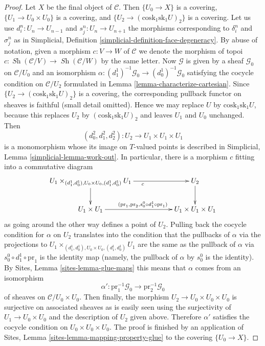 \documentclass{stacks-project}
\theoremstyle{plain}
\theoremstyle{definition}
\theoremstyle{remark}
\numberwithin{equation}{subsection}
\def\Sh{\mathop{\mathit{Sh}}\nolimits}
\begin{document}
\begin{proof}
\medskip\noindent
Let $X$ be the final object of $\mathcal{C}$.
Then $\{U_0 \to X\}$ is a covering,
$\{U_1 \to U_0 \times U_0\}$ is a covering, and
$\{U_2 \to (\text{cosk}_1 \text{sk}_1 U)_2\}$ is a covering.
Let us use $d^n_i : U_n \to U_{n - 1}$ and
$s^n_j : U_n \to U_{n + 1}$ the morphisms corresponding
to $\delta^n_i$ and $\sigma^n_j$ as in
Simplicial, Definition \ref{simplicial-definition-face-degeneracy}.
By abuse of notation, given a morphism
$c : V \to W$ of $\mathcal{C}$ we denote the morphism of topoi
$c : \Sh(\mathcal{C}/V) \to \Sh(\mathcal{C}/W)$ by the same letter.
Now $\mathcal{G}$ is given by a sheaf $\mathcal{G}_0$
on $\mathcal{C}/U_0$ and an isomorphism
$\alpha : (d^1_1)^{-1}\mathcal{G}_0 \to (d^1_0)^{-1}\mathcal{G}_0$
satisfying the cocycle condition on $\mathcal{C}/U_2$
formulated in Lemma \ref{lemma-characterize-cartesian}.
Since $\{U_2 \to (\text{cosk}_1 \text{sk}_1 U)_2\}$
is a covering, the corresponding pullback functor
on sheaves is faithful (small detail omitted).
Hence we may replace $U$ by $\text{cosk}_1 \text{sk}_1 U$, because
this replaces $U_2$ by $(\text{cosk}_1 \text{sk}_1 U)_2$ and leaves
$U_1$ and $U_0$ unchanged. Then
$$
(d^2_0, d^2_1, d^2_2) : U_2 \to U_1 \times U_1 \times U_1
$$
is a monomorphism whose its image on $T$-valued points is
described in Simplicial, Lemma \ref{simplicial-lemma-work-out}.
In particular, there is a morphism $c$ fitting into a commutative diagram
$$
\xymatrix{
U_1 \times_{(d^1_1, d^1_0), U_0 \times U_0, (d^1_1, d^1_0)} U_1
\ar[d] \ar[rr]_c & & U_2 \ar[d] \\
U_1 \times U_1
\ar[rr]^{(\text{pr}_1, \text{pr}_2, s^0_0 \circ d^1_1 \circ \text{pr}_1)} & &
U_1 \times U_1 \times U_1
}
$$
as going around the other way defines a point of $U_2$.
Pulling back the cocycle condition for $\alpha$ on $U_2$
translates into the condition that the pullbacks of $\alpha$
via the projections to
$U_1 \times_{(d^1_1, d^1_0), U_0 \times U_0, (d^1_1, d^1_0)} U_1$
are the same as the pullback of $\alpha$ via
$s^0_0 \circ d^1_1 \circ \text{pr}_1$ is the identity map
(namely, the pullback of $\alpha$ by $s^0_0$ is the identity).
By Sites, Lemma \ref{sites-lemma-glue-maps}
this means that $\alpha$ comes from an isomorphism
$$
\alpha' : \text{pr}_1^{-1}\mathcal{G}_0 \to \text{pr}_2^{-1}\mathcal{G}_0
$$
of sheaves on $\mathcal{C}/U_0 \times U_0$.
Then finally, the morphism $U_2 \to U_0 \times U_0 \times U_0$
is surjective on associated sheaves as is easily seen using the
surjectivity of $U_1 \to U_0 \times U_0$
and the description of $U_2$ given above. Therefore $\alpha'$
satisfies the cocycle condition on $U_0 \times U_0 \times U_0$.
The proof is finished by an application of
Sites, Lemma \ref{sites-lemma-mapping-property-glue}
to the covering $\{U_0 \to X\}$.
\end{proof}
\end{document}

